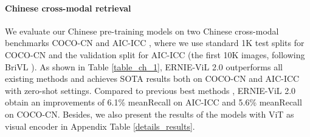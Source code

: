 \documentclass{article}
\begin{document}
\paragraph{Chinese cross-modal retrieval}
We evaluate our Chinese pre-training models on two Chinese cross-modal benchmarks COCO-CN \cite{li2018cococn} and AIC-ICC \cite{wu2019large}, where we use standard 1K test splits for COCO-CN and the validation split for AIC-ICC (the first 10K images, following BriVL \cite{Huo2021WenLanBV}). As shown in Table \ref{table_ch_1}, ERNIE-ViL 2.0 outperforms all existing methods \cite{Huo2021WenLanBV,Fengshenbang-LM,xie2022zero,gu2022wukong,M3P,Radford2018ImprovingLU} and achieves SOTA results both on COCO-CN and AIC-ICC with zero-shot settings.  Compared to previous best methods \cite{xie2022zero}, ERNIE-ViL 2.0 obtain an improvements of 6.1\% meanRecall on AIC-ICC and 5.6\% meanRecall on COCO-CN. Besides, we also present the results of the models with ViT as visual encoder in Appendix Table \ref{details_results}.
\end{document}
